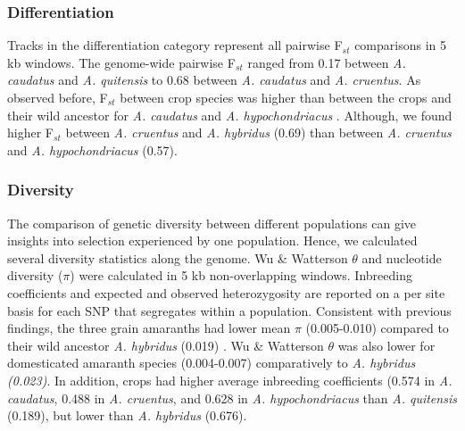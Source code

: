 \documentclass[9pt,twocolumn,twoside]{celabRxiv}
\begin{document}
\subsubsection{Differentiation} 
Tracks in the differentiation category represent all pairwise F$_{st}$ comparisons in 5 kb windows. 
The genome-wide pairwise F$_{st}$ ranged from 0.17 between \textit{A. caudatus} and \textit{A. quitensis} to 0.68 between \textit{A. caudatus} and \textit{A. cruentus}. 
As observed before, F$_{st}$ between crop species was higher than between the crops and their wild ancestor for \textit{A. caudatus} and \textit{A. hypochondriacus} \citep{stetter2020parallel}. 
Although, we found higher F$_{st}$ between \textit{A. cruentus} and \textit{A. hybridus} (0.69) than between \textit{A. cruentus} and \textit{A. hypochondriacus} (0.57).






\subsubsection{Diversity} 
The comparison of genetic diversity between different populations can give insights into selection experienced by one population.
Hence, we calculated several diversity statistics along the genome.
Wu \& Watterson $\theta$ and nucleotide diversity ($\pi$) were calculated in 5 kb non-overlapping windows. 
Inbreeding coefficients and expected and observed heterozygosity are reported on a per site basis for each SNP that segregates within a population.
Consistent with previous findings, the three grain amaranths had lower mean $\pi$ (0.005-0.010) compared to their wild ancestor \textit{A. hybridus} (0.019) \citep{stetter2020parallel}. 
Wu \& Watterson $\theta$ was also lower for domesticated amaranth species (0.004-0.007) comparatively to \textit{\textit{A. hybridus} (0.023)}.
In addition, crops had higher average inbreeding coefficients (0.574 in \textit{A. caudatus}, 0.488 in \textit{A. cruentus}, and 0.628 in \textit{A. hypochondriacus} than \textit{A. quitensis} (0.189), but lower than \textit{A. hybridus} (0.676).
 
\end{document}
